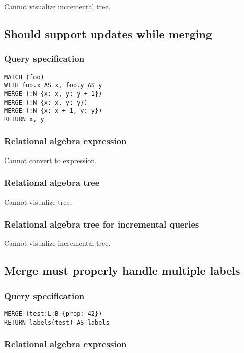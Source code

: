 Cannot visualize incremental tree.

\subsection{Should support updates while merging}

\subsubsection*{Query specification}

\begin{lstlisting}
MATCH (foo)
WITH foo.x AS x, foo.y AS y
MERGE (:N {x: x, y: y + 1})
MERGE (:N {x: x, y: y})
MERGE (:N {x: x + 1, y: y})
RETURN x, y
\end{lstlisting}

\subsubsection*{Relational algebra expression}

Cannot convert to expression.

\subsubsection*{Relational algebra tree}

Cannot visualize tree.

\subsubsection*{Relational algebra tree for incremental queries}

Cannot visualize incremental tree.

\subsection{Merge must properly handle multiple labels}

\subsubsection*{Query specification}

\begin{lstlisting}
MERGE (test:L:B {prop: 42})
RETURN labels(test) AS labels
\end{lstlisting}

\subsubsection*{Relational algebra expression}

